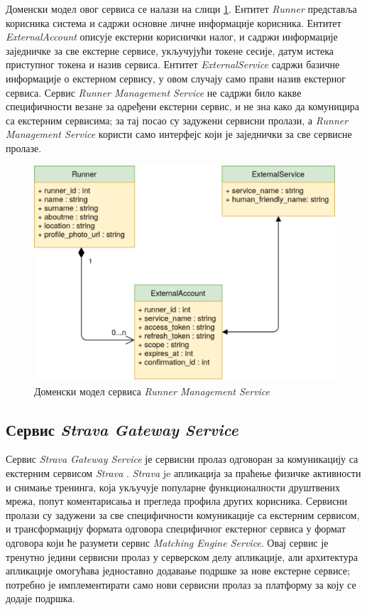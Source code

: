 \documentclass[12pt,oneside]{memoir}
\begin{document}
Доменски модел овог сервиса се налази на слици \ref{fig:runner-management-service-model}. Ентитет \textit{Runner} представља корисника система и садржи основне личне информације корисника. Ентитет \textit{ExternalAccount} описује екстерни кориснички налог, и садржи информације заједничке за све екстерне сервисе, укључујући токене сесије, датум истека приступног токена и назив сервиса. Ентитет \textit{ExternalService} садржи базичне информације о екстерном сервису, у овом случају само прави назив екстерног сервиса. Сервис \textit{Runner Management Service} не садржи било какве специфичности везане за одређени екстерни сервис, и не зна како да комуницира са екстерним сервисима; за тај посао су задужени сервисни пролази, а \textit{Runner Management Service} користи само интерфејс који је заједнички за све сервисне пролазе.

\begin{figure}[!ht]
  \centering
  \includegraphics[scale=0.7]{slike/runner-management-service-model.png}
  \caption{Доменски модел сервиса \textit{Runner Management Service}}
  \label{fig:runner-management-service-model}
\end{figure}

\subsection{Сервис \textit{Strava Gateway Service}}
Сервис \textit{Strava Gateway Service} је сервисни пролаз одговоран за комуникацију са екстерним сервисом \textit{Strava} \cite{stravaapi}. \textit{Strava} je апликација за праћење физичке активности и снимање тренинга, која укључује популарне функционалности друштвених мрежа, попут коментарисања и прегледа профила других корисника. Сервисни пролази су задужени за све специфичности комуникације са екстерним сервисом, и трансформацију формата одговора специфичног екстерног сервиса у формат одговора који ће разумети сервис \textit{Matching Engine Service}. Овај сервис је тренутно једини сервисни пролаз у серверском делу апликације, али архитектура апликације омогућава једноставно додавање подршке за нове екстерне сервисе; потребно је имплементирати само нови сервисни пролаз за платформу за коју се додаје подршка.
\end{document}
